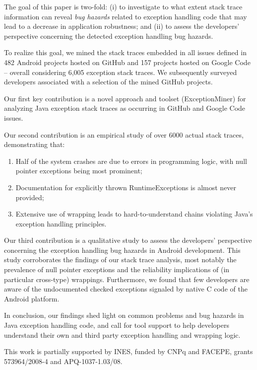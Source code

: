 The goal of this paper is two-fold: (i) to investigate 
to what extent stack trace information can reveal \emph{bug hazards} 
related to exception handling code that may lead to a decrease in
application robustness; and (ii) to assess the developers' perspective
concerning the detected exception handling bug hazards.

To realize this goal, we mined the stack 
traces embedded in all issues defined in 482 Android projects hosted on GitHub and 
157 projects hosted on Google Code -- overall considering 6,005
exception stack traces. We subsequently surveyed developers associated with 
a selection of 
the mined GitHub projects.

Our first key contribution is
a novel approach and toolset (ExceptionMiner) for analyzing Java
  exception stack traces as occurring in GitHub and Google Code
  issues.

Our second contribution is
an empirical study of over 6000 actual stack traces,
  demonstrating that:
\begin{enumerate} 
  \item Half of the system crashes are due to errors
  in programming logic, with null pointer exceptions being most
  prominent;
  \item Documentation for explicitly thrown RuntimeExceptions is almost
  never provided; 
  \item Extensive use of wrapping leads to hard-to-understand chains
  violating Java's exception handling principles.
\end{enumerate}  

Our third contribution is a qualitative study to assess the 
developers' perspective concerning the exception handling 
bug hazards in Android development.
This study corroborates the findings of our stack trace analysis, most notably the prevalence
of null pointer exceptions and the reliability implications of (in particular cross-type) wrappings.
Furthermore, we found that few developers are aware of the undocumented checked exceptions signaled by native C code of the Android platform.

In conclusion, our findings shed light on common problems and bug hazards in Java
exception handling code, and call for tool support to help developers
understand their own and third party exception handling and wrapping logic.

\begin{acknowledgements}
This work is partially supported by INES, funded by CNPq and
FACEPE, grants 573964/2008-4 and APQ-1037-1.03/08.
\end{acknowledgements}






